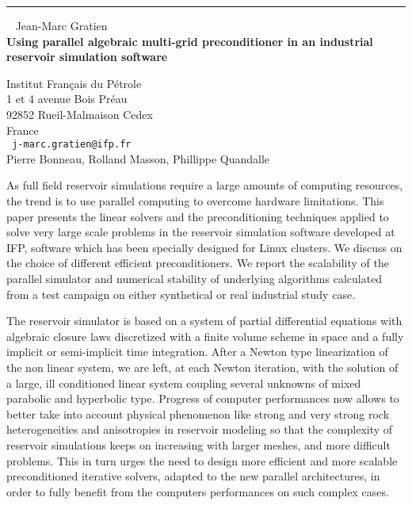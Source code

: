 \documentclass{report}
\begin{document}
\begin{center}

\rule{6in}{1pt} \
{\large
Jean-Marc Gratien
\\ {\bf
Using parallel algebraic multi-grid preconditioner in an industrial
reservoir simulation software
}}

Institut Fran\c{c}ais du P\'{e}trole
\\
1 et 4 avenue Bois Pr\'{e}au
\\
92852 Rueil-Malmaison Cedex
\\
France
\\ {\tt
j-marc.gratien@ifp.fr
}
\\
Pierre Bonneau,
Rolland Masson,
Phillippe Quandalle
\end{center}

As full field reservoir simulations require a large amounts of
computing resources, the trend is to use parallel computing to overcome
hardware limitations. This paper presents the linear solvers and the
preconditioning techniques applied to solve very large scale problems
in the reservoir simulation software developed at IFP, software which
has been specially designed for Linux clusters. We discuss on the
choice of different efficient preconditioners. We report the
scalability of the parallel simulator and numerical stability of
underlying algorithms calculated from a test campaign on either
synthetical or real industrial study case.

The reservoir simulator is based on a system of partial differential
equations with algebraic closure laws discretized with a finite volume
scheme in space and a fully implicit or semi-implicit time integration.
After a Newton type linearization of the non linear system, we are
left, at each Newton iteration, with the solution of a large, ill
conditioned linear system coupling several unknowns of mixed parabolic
and hyperbolic type. Progress of computer performances now allows to
better take into account physical phenomenon like strong and very
strong rock heterogeneities and anisotropies in reservoir modeling so
that the complexity of reservoir simulations keeps on increasing with
larger meshes, and more difficult problems. This in turn urges the need
to design more efficient and more scalable preconditioned iterative
solvers, adapted to the new parallel architectures, in order to fully
benefit from the computers performances on such complex cases.
\end{document}

